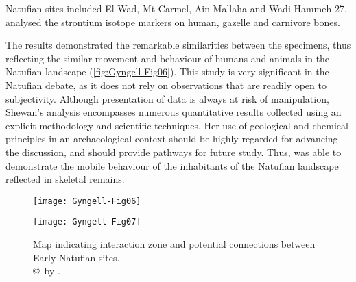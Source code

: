 Natufian sites included El Wad, Mt Carmel, Ain Mallaha and Wadi Hammeh 27. \textcite[71]{Shewan_2004} analysed the strontium isotope markers on human, gazelle and carnivore bones.

The results demonstrated the remarkable similarities between the specimens, thus reflecting the similar movement and behaviour of humans and animals in the Natufian landscape \parencite[79]{Shewan_2004} (\cref{fig:Gyngell-Fig06}). 
This study is very significant in the Natufian debate, as it does not rely on observations that are readily open to subjectivity. Although presentation of data is always at risk of manipulation, Shewan’s analysis encompasses numerous quantitative results collected using an explicit methodology and scientific techniques. 
Her use of geological and chemical principles in an archaeological context should be highly regarded for advancing the discussion, and should provide pathways for future study. 
Thus, \textcite{Shewan_2004} was able to demonstrate the mobile behaviour of the inhabitants of the Natufian landscape reflected in skeletal remains.
\clearpage
{}
\begin{wrapfigure}{O}[3cm]{0.5\textwidth} 
\texttt{[image: Gyngell-Fig06]}
\caption{Strontium ratios in gazelle, carnivore and human bones at Natufian sites.
        {\normalfont\scriptsize \\ \copyright\ by 
 \textcite{Shewan_2004}.
                  }}
\label{fig:Gyngell-Fig06}
\vspace*{.9\baselineskip}

	\texttt{[image: Gyngell-Fig07]}
	\caption{Map indicating interaction zone and potential connections between Early Natufian sites.
		{\normalfont\scriptsize \\ \copyright\ by 
			 \textcite{Edwards_2015}.
		}}
		\label{fig:Gyngell-Fig07}
\end{wrapfigure}

